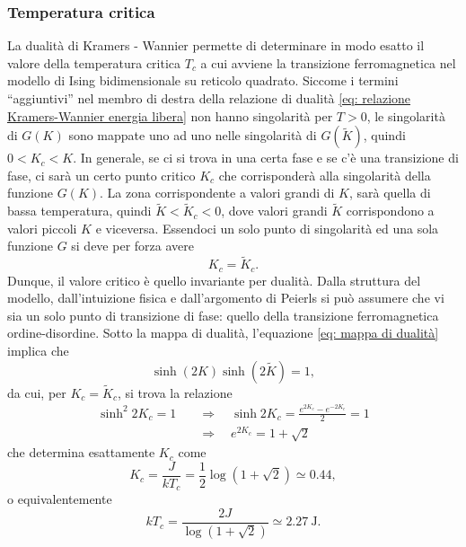 \subsubsection{Temperatura critica}
La dualità di Kramers - Wannier permette di determinare in modo esatto il valore della temperatura critica $T_c$ a cui avviene la transizione ferromagnetica nel modello di Ising bidimensionale su reticolo quadrato. Siccome i termini ``aggiuntivi'' nel membro di destra della relazione di dualità \eqref{eq: relazione Kramers-Wannier energia libera} non hanno singolarità per $T > 0$, le singolarità di $G(K)$ sono mappate uno ad uno nelle singolarità di $G(\tilde{K})$, quindi $0 < K_c < K$. In generale, se ci si trova in una certa fase e se c'è una transizione di fase, ci sarà un certo punto critico $K_c$ che corrisponderà alla singolarità della funzione $G(K)$. La zona corrispondente a valori grandi di $K$, sarà quella di bassa temperatura, quindi $\tilde{K} < \tilde{K}_c < 0 $, dove valori grandi $\tilde{K}$ corrispondono a valori piccoli $K$ e viceversa. Essendoci un solo punto di singolarità ed una sola funzione $G$ si deve per forza avere
\begin{equation}
    K_c = \tilde{K}_c.
\end{equation}
Dunque, il valore critico è quello invariante per dualità. Dalla struttura del modello, dall'intuizione fisica e dall'argomento di Peierls si può assumere che vi sia un solo punto di transizione di fase: quello della transizione ferromagnetica ordine-disordine. Sotto la mappa di dualità, l'equazione \eqref{eq: mappa di dualità} implica che
\begin{equation}
    \sinh{(2K)}\sinh{(2\tilde{K})} = 1,
\end{equation}
da cui, per $K_c = \tilde{K}_c$, si trova la relazione
\begin{equation}
\label{eq: relazione per K critico}
    \begin{split}
        \sinh^2{2K_c} = 1&\quad\Longrightarrow\quad \sinh{2K_c} = \frac{e^{2K_c} - e^{-2K_c}}{2} = 1\\
        &\quad\Longrightarrow\quad e^{2K_c} = 1 + \sqrt{2}
    \end{split}
\end{equation}
che determina esattamente $K_c$ come
\begin{equation}
\label{eq: K critico}
    K_c = \frac{J}{kT_c} = \frac{1}{2}\log{(1 + \sqrt{2})} \simeq 0.44,
\end{equation}
o equivalentemente 
\begin{equation}
    kT_c = \frac{2J}{\log{(1 + \sqrt{2})}} \simeq \SI{2.27}{\joule}.
\end{equation}

